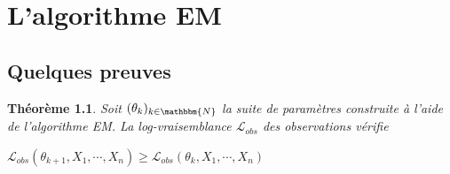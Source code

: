\documentclass[frenchb]{report}
\newcommand{\N}{\mathbbm{N}}
\newcommand{\1}{\mathbbm{1}}
\newcommand{\lv}{\mathcal{L}}
\newtheorem{thm}{Théorème}
\theoremstyle{definition}\newtheorem{defn}{Définition}
\theoremstyle{definition}\newtheorem{exm}{Exemple}
\theoremstyle{definition}\newtheorem{nota}{Notation}
\theoremstyle{definition}\newtheorem{rem}{Remarque}
\begin{document}
\pagebreak

\chapter{L'algorithme EM}


\section{Quelques preuves}

\begin{thm}
Soit $(\theta_k)_{k\in \N}$ la suite de paramètres construite à l'aide de l'algorithme EM. La log-vraisemblance $\lv_{obs}$ des observations vérifie 
\begin{center} $\lv_{obs}(\theta_{k+1}, X_1, \cdots, X_n) \geq \lv_{obs}(\theta_k, X_1, \cdots, X_n)$ \end{center}
\end{thm}
\end{document}
